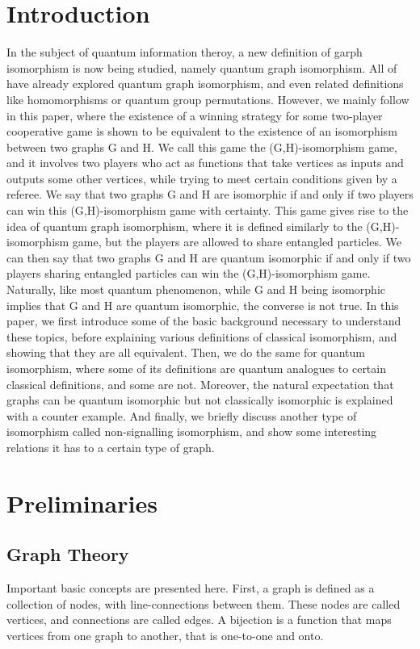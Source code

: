 \documentclass[12pt]{article}
\begin{document}
\section{Introduction}
\label{sec:intro}
In the subject of quantum information theroy, a new definition of garph isomorphism is now being studied, namely quantum graph isomorphism. All of \cite{laura, musto2018, QuanPerm, GraphHom, QuanMonad} have already explored quantum graph isomorphism, and even related definitions like homomorphisms or quantum group permutations. However, we mainly follow \cite{laura} in this paper, where the existence of a winning strategy for some two-player cooperative game is shown to be equivalent to the existence of an isomorphism between two graphs G and H. We call this game the (G,H)-isomorphism game, and it involves two players who act as functions that take vertices as inputs and outputs some other vertices, while trying to meet certain conditions given by a referee. We say that two graphs G and H are isomorphic if and only if two players can win this (G,H)-isomorphism game with certainty. This game gives rise to the idea of quantum graph isomorphism, where it is defined similarly to the (G,H)-isomorphism game, but the players are allowed to share entangled particles. We can then say that two graphs G and H are quantum isomorphic if and only if two players sharing entangled particles can win the (G,H)-isomorphism game. Naturally, like most quantum phenomenon, while G and H being isomorphic implies that G and H are quantum isomorphic, the converse is not true. In this paper, we first introduce some of the basic background necessary to understand these topics, before explaining various definitions of classical isomorphism, and showing that they are all equivalent. Then, we do the same for quantum isomorphism, where some of its definitions are quantum analogues to certain classical definitions, and some are not. Moreover, the natural expectation that graphs can be quantum isomorphic but not classically isomorphic is explained with a counter example. And finally, we briefly discuss another type of isomorphism called non-signalling isomorphism, and show some interesting relations it has to a certain type of graph.


\section{Preliminaries} \label{prelim}
\subsection{Graph Theory}
Important basic concepts are presented here. First, a graph is defined as a collection of nodes, with line-connections between them. These nodes are called vertices, and connections are called edges. A bijection is a function that maps vertices from one graph to another, that is one-to-one and onto.
\end{document}

